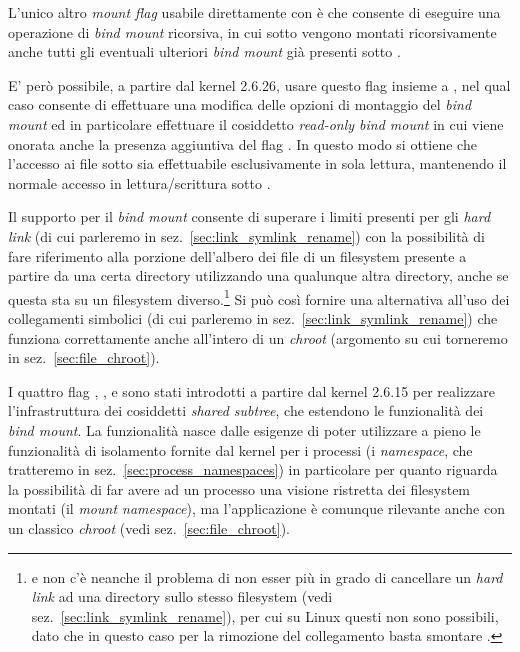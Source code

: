 L'unico altro \textit{mount flag} usabile direttamente con  è
 che consente di eseguire una operazione di \textit{bind mount}
ricorsiva, in cui sotto  vengono montati ricorsivamente anche
tutti gli eventuali ulteriori \textit{bind mount} già presenti sotto
.

E' però possibile, a partire dal kernel 2.6.26, usare questo flag insieme a
, nel qual caso consente di effettuare una modifica delle
opzioni di montaggio del \textit{bind mount} ed in particolare effettuare il
cosiddetto \textit{read-only bind mount} in cui viene onorata anche la
presenza aggiuntiva del flag . In questo modo si ottiene che
l'accesso ai file sotto  sia effettuabile esclusivamente in sola
lettura, mantenendo il normale accesso in lettura/scrittura sotto
.

Il supporto per il \textit{bind mount} consente di superare i limiti presenti
per gli \textit{hard link} (di cui parleremo in
sez.~\ref{sec:link_symlink_rename}) con la possibilità di fare riferimento
alla porzione dell'albero dei file di un filesystem presente a partire da una
certa directory utilizzando una qualunque altra directory, anche se questa sta
su un filesystem diverso.\footnote{e non c'è neanche il problema di non esser
  più in grado di cancellare un \textit{hard link} ad una directory sullo
  stesso filesystem (vedi sez.~\ref{sec:link_symlink_rename}), per cui su
  Linux questi non sono possibili, dato che in questo caso per la rimozione
  del collegamento basta smontare .} Si può così fornire una
alternativa all'uso dei collegamenti simbolici (di cui parleremo in
sez.~\ref{sec:link_symlink_rename}) che funziona correttamente anche
all'intero di un \textit{chroot} (argomento su cui torneremo in
sez.~\ref{sec:file_chroot}).


I quattro flag , ,  e
 sono stati introdotti a partire dal kernel 2.6.15 per
realizzare l'infrastruttura dei cosiddetti \textit{shared subtree}, che
estendono le funzionalità dei \textit{bind mount}.  La funzionalità nasce
dalle esigenze di poter utilizzare a pieno le funzionalità di isolamento
fornite dal kernel per i processi (i \textit{namespace}, che tratteremo in
sez.~\ref{sec:process_namespaces}) in particolare per quanto riguarda la
possibilità di far avere ad un processo una visione ristretta dei filesystem
montati (il \textit{mount namespace}), ma l'applicazione è comunque rilevante
anche con un classico \textit{chroot} (vedi sez.~\ref{sec:file_chroot}).


